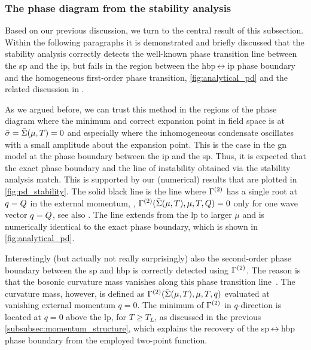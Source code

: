 \subsubsection{The phase diagram from the stability analysis}
\label{subsubsec:phase_diagram_stability_analysis}

Based on our previous discussion, we turn to the central result of this subsection.
Within the following paragraphs it is demonstrated and briefly discussed that the stability analysis correctly detects the well-known phase transition line between the \gls{sp} and the \gls{ip}, but fails in the region between the \gls{hbp}$\,\leftrightarrow\,$\gls{ip} phase boundary and the homogeneous first-order phase transition, \cf{} \cref{fig:analytical_pd} and the related discussion in .\bigskip

As we argued before, we can trust this method in the regions of the phase diagram where the minimum and correct expansion point in field space is at ${\bar{\sigma} = \bar{\Sigma} ( \mu, T ) = 0}$ and especially where the inhomogeneous condensate oscillates with a small amplitude about the expansion point.
This is the case in the \gls{gn} model at the phase boundary between the \gls{ip} and the \gls{sp}.
Thus, it is expected that the exact phase boundary and the line of instability obtained via the stability analysis match.
This is supported by our (numerical) results that are plotted in \cref{fig:pd_stability}.
The solid black line is the line where $\Gamma^{(2)}$ has a single root at ${q = Q}$ in the external momentum, \ie{}, ${\Gamma^{(2)} ( \bar{\Sigma} ( \mu, T ), \mu, T, Q) = 0}$ only for one wave vector ${q = Q}$, see also .
The line extends from the \gls{lp} to larger $\mu$ and is numerically identical to the exact phase boundary, which is shown in \cref{fig:analytical_pd}.

Interestingly (but actually not really surprisingly) also the second-order phase boundary between the \gls{sp} and \gls{hbp} is correctly detected using $\Gamma^{(2)}$.
The reason is that the bosonic curvature mass vanishes along this phase transition line~\cite{Dolan:1973qd,Weinberg:1974hy,Harrington:1974tf,Thies:2003kk}.
The curvature mass, however, is defined as ${\Gamma^{(2)} ( \bar{\Sigma} ( \mu, T ), \mu, T, q)}$ evaluated at vanishing external momentum ${q = 0}$.
The minimum of $\Gamma^{(2)}$ in $q$-direction is located at ${q = 0}$ above the \gls{lp}, \viz{} for $T\geq T_L$, as discussed in the previous \cref{subsubsec:momentum_structure}, which explains the recovery of the \gls{sp}$\,\leftrightarrow\,$\gls{hbp} phase boundary from the employed two-point function.

